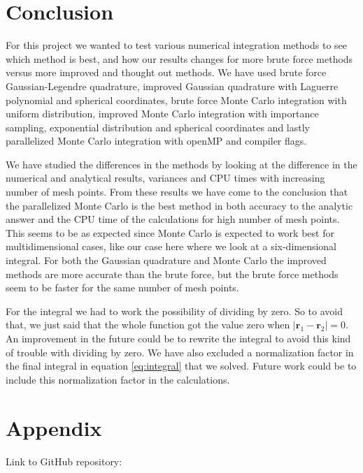 \documentclass[12pt,a4paper,english]{article}
\begin{document}
\section{Conclusion}
For this project we wanted to test various numerical integration methods to see which method is best, and how our results changes for more brute force methods versus more improved and thought out methods. We have used brute force Gaussian-Legendre quadrature, improved Gaussian quadrature with Laguerre polynomial and spherical coordinates, brute force Monte Carlo integration with uniform distribution, improved Monte Carlo integration with importance sampling, exponential distribution and spherical coordinates and lastly parallelized Monte Carlo integration with openMP and compiler flags.

We have studied the differences in the methods by looking at the difference in the numerical and analytical results, variances and CPU times with increasing number of mesh points. From these results we have come to the conclusion that the parallelized Monte Carlo is the best method in both accuracy to the analytic answer and the CPU time of the calculations for high number of mesh points. This seems to be as expected since Monte Carlo is expected to work best for multidimensional cases, like our case here where we look at a six-dimensional integral. For both the Gaussian quadrature and Monte Carlo the improved methods are more accurate than the brute force, but the brute force methods seem to be faster for the same number of mesh points. 

For the integral we had to work the possibility of dividing by zero. So to avoid that, we just said that the whole function got the value zero when $|\textbf{r}_1-\textbf{r}_2|=0$. An improvement in the future could be to rewrite the integral to avoid this kind of trouble with dividing by zero. We have also excluded a normalization factor in the final integral in equation \ref{eq:integral} that we solved. Future work could be to include this normalization factor in the calculations.

\appendix
\section{Appendix}
\label{sect:appendix}
Link to GitHub repository:\\



\end{document}
